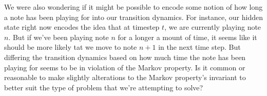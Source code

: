 \documentclass[11pt]{article}
\begin{document}
We were also wondering if it might be possible to encode some notion of
how long a note has been playing for into our transition dynamics. For instance,
our hidden state right now encodes the idea that at timestep $t$, we are currently
playing note $n$. But if we've been playing note $n$ for a longer a mount of time,
it seems like it should be more likely tat we move to note $n+1$ in the next time step.
But differing the transition dynamics based on how much time the note has been playing
for seems to be in violation of the Markov property. Is it common or reasonable
to make slightly alterations to the Markov property's invariant to better suit the
type of problem that we're attempting to solve?
\end{document}
